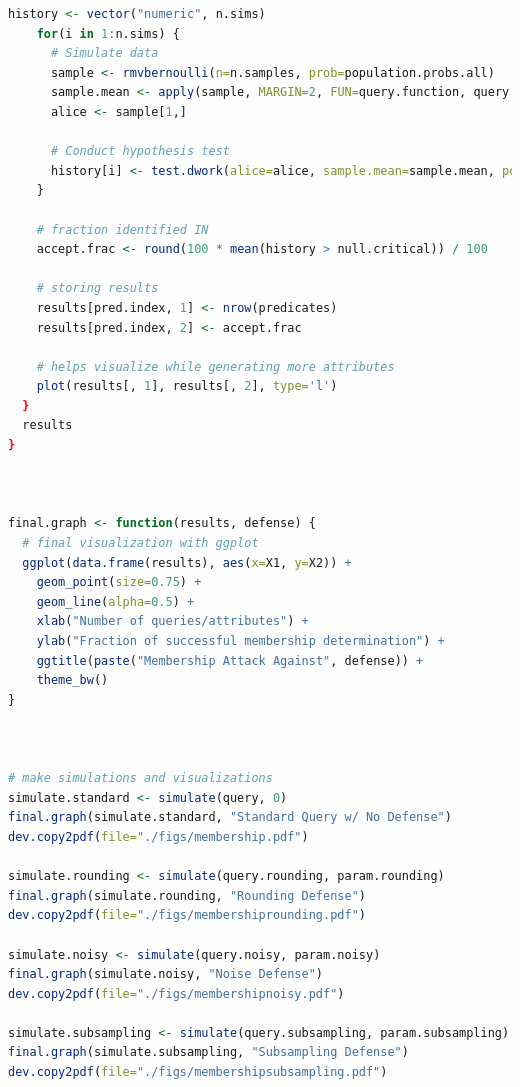 \documentclass[12pt]{article}
\begin{document}
\begin{lstlisting}[language=R]
    history <- vector("numeric", n.sims)
    for(i in 1:n.sims) {
      # Simulate data
      sample <- rmvbernoulli(n=n.samples, prob=population.probs.all)
      sample.mean <- apply(sample, MARGIN=2, FUN=query.function, query.param)
      alice <- sample[1,]
  
      # Conduct hypothesis test
      history[i] <- test.dwork(alice=alice, sample.mean=sample.mean, population.mean=population.means.all)
    }
    
    # fraction identified IN
    accept.frac <- round(100 * mean(history > null.critical)) / 100
    
    # storing results
    results[pred.index, 1] <- nrow(predicates)
    results[pred.index, 2] <- accept.frac
    
    # helps visualize while generating more attributes
    plot(results[, 1], results[, 2], type='l')
  }
  results
}



final.graph <- function(results, defense) {
  # final visualization with ggplot
  ggplot(data.frame(results), aes(x=X1, y=X2)) +
    geom_point(size=0.75) +
    geom_line(alpha=0.5) +
    xlab("Number of queries/attributes") +
    ylab("Fraction of successful membership determination") + 
    ggtitle(paste("Membership Attack Against", defense)) +
    theme_bw()
}



# make simulations and visualizations
simulate.standard <- simulate(query, 0)
final.graph(simulate.standard, "Standard Query w/ No Defense")
dev.copy2pdf(file="./figs/membership.pdf")

simulate.rounding <- simulate(query.rounding, param.rounding)
final.graph(simulate.rounding, "Rounding Defense")
dev.copy2pdf(file="./figs/membershiprounding.pdf")

simulate.noisy <- simulate(query.noisy, param.noisy)
final.graph(simulate.noisy, "Noise Defense")
dev.copy2pdf(file="./figs/membershipnoisy.pdf")

simulate.subsampling <- simulate(query.subsampling, param.subsampling)
final.graph(simulate.subsampling, "Subsampling Defense")
dev.copy2pdf(file="./figs/membershipsubsampling.pdf")
\end{lstlisting}
\end{document}
